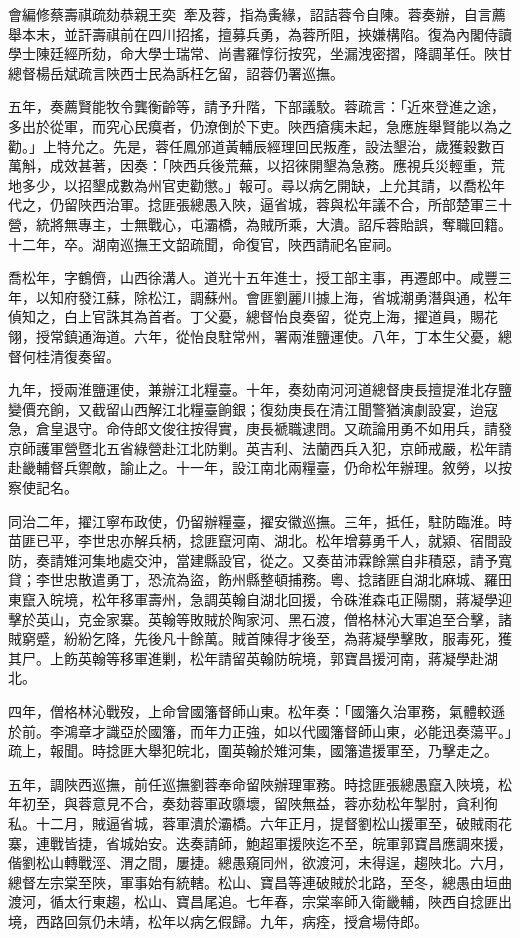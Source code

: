 \begin{pinyinscope}
會編修蔡壽祺疏劾恭親王奕，牽及蓉，指為夤緣，詔詰蓉令自陳。蓉奏辦，自言薦舉本末，並訐壽祺前在四川招搖，擅募兵勇，為蓉所阻，挾嫌構陷。復為內閣侍讀學士陳廷經所劾，命大學士瑞常、尚書羅惇衍按究，坐漏洩密摺，降調革任。陜甘總督楊岳斌疏言陜西士民為訴枉乞留，詔蓉仍署巡撫。

五年，奏薦賢能牧令龔衡齡等，請予升階，下部議駮。蓉疏言：「近來登進之途，多出於從軍，而究心民瘼者，仍潦倒於下吏。陜西瘡痍未起，急應旌舉賢能以為之勸。」上特允之。先是，蓉任鳳邠道黃輔辰經理回民叛產，設法墾治，歲獲穀數百萬斛，成效甚著，因奏：「陜西兵後荒蕪，以招徠開墾為急務。應視兵災輕重，荒地多少，以招墾成數為州官吏勸懲。」報可。尋以病乞開缺，上允其請，以喬松年代之，仍留陜西治軍。捻匪張總愚入陜，逼省城，蓉與松年議不合，所部楚軍三十營，統將無專主，士無戰心，屯灞橋，為賊所乘，大潰。詔斥蓉貽誤，奪職回籍。十二年，卒。湖南巡撫王文韶疏聞，命復官，陜西請祀名宦祠。

喬松年，字鶴儕，山西徐溝人。道光十五年進士，授工部主事，再遷郎中。咸豐三年，以知府發江蘇，除松江，調蘇州。會匪劉麗川據上海，省城潮勇潛與通，松年偵知之，白上官誅其為首者。丁父憂，總督怡良奏留，從克上海，擢道員，賜花翎，授常鎮通海道。六年，從怡良駐常州，署兩淮鹽運使。八年，丁本生父憂，總督何桂清復奏留。

九年，授兩淮鹽運使，兼辦江北糧臺。十年，奏劾南河河道總督庚長擅提淮北存鹽變價充餉，又截留山西解江北糧臺餉銀；復劾庚長在清江聞警猶演劇設宴，迨寇急，倉皇退守。命侍郎文俊往按得實，庚長褫職逮問。又疏論用勇不如用兵，請發京師護軍營暨北五省綠營赴江北防剿。英吉利、法蘭西兵入犯，京師戒嚴，松年請赴畿輔督兵禦敵，諭止之。十一年，設江南北兩糧臺，仍命松年辦理。敘勞，以按察使記名。

同治二年，擢江寧布政使，仍留辦糧臺，擢安徽巡撫。三年，抵任，駐防臨淮。時苗匪已平，李世忠亦解兵柄，捻匪竄河南、湖北。松年增募勇千人，就潁、宿間設防，奏請雉河集地處交沖，當建縣設官，從之。又奏苗沛霖餘黨自非積惡，請予寬貸；李世忠散遣勇丁，恐流為盜，飭州縣整頓捕務。粵、捻諸匪自湖北麻城、羅田東竄入皖境，松年移軍壽州，急調英翰自湖北回援，令硃淮森屯正陽關，蔣凝學迎擊於英山，克金家寨。英翰等敗賊於陶家河、黑石渡，僧格林沁大軍追至合擊，諸賊窮蹙，紛紛乞降，先後凡十餘萬。賊首陳得才後至，為蔣凝學擊敗，服毒死，獲其尸。上飭英翰等移軍進剿，松年請留英翰防皖境，郭寶昌援河南，蔣凝學赴湖北。

四年，僧格林沁戰歿，上命曾國籓督師山東。松年奏：「國籓久治軍務，氣體較遜於前。李鴻章才識亞於國籓，而年力正強，如以代國籓督師山東，必能迅奏蕩平。」疏上，報聞。時捻匪大舉犯皖北，圍英翰於雉河集，國籓遣援軍至，乃擊走之。

五年，調陜西巡撫，前任巡撫劉蓉奉命留陜辦理軍務。時捻匪張總愚竄入陜境，松年初至，與蓉意見不合，奏劾蓉軍政隳壞，留陜無益，蓉亦劾松年掣肘，貪利徇私。十二月，賊逼省城，蓉軍潰於灞橋。六年正月，提督劉松山援軍至，破賊雨花寨，連戰皆捷，省城始安。迭奏請師，鮑超軍援陜迄不至，皖軍郭寶昌應調來援，偕劉松山轉戰涇、渭之間，屢捷。總愚窺同州，欲渡河，未得逞，趨陜北。六月，總督左宗棠至陜，軍事始有統轄。松山、寶昌等連破賊於北路，至冬，總愚由垣曲渡河，循太行東趨，松山、寶昌尾追。七年春，宗棠率師入衛畿輔，陜西自捻匪出境，西路回氛仍未靖，松年以病乞假歸。九年，病痊，授倉場侍郎。


\end{pinyinscope}

